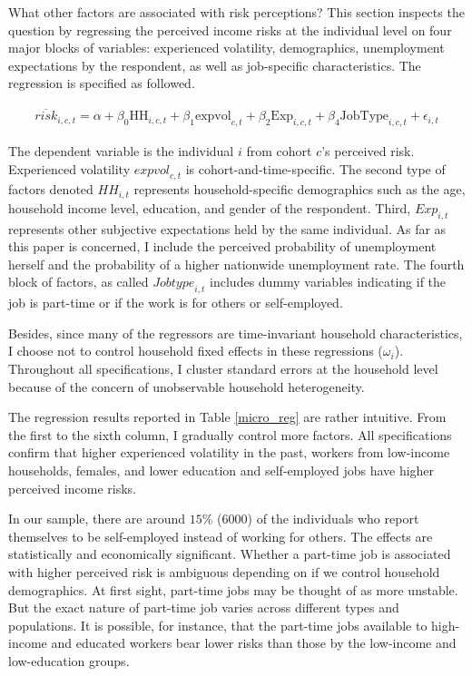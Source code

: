 \documentclass[12pt,notitlepage,onecolumn,aps,pra]{article}
\begin{document}
What other factors are associated with risk perceptions? This section
inspects the question by regressing the perceived income risks at the
individual level on four major blocks of variables: experienced
volatility, demographics, unemployment expectations by the respondent,
as well as job-specific characteristics. The regression is specified as
followed.

\begin{eqnarray}
\overline{risk}_{i,c,t} = \alpha + \beta_0 \textrm{HH}_{i,c,t} + \beta_1 \textrm{expvol}_{c,t} + \beta_2 \textrm{Exp}_{i,c,t} + \beta_4 \textrm{JobType}_{i,c,t} + \epsilon_{i,t}
\end{eqnarray}

The dependent variable is the individual \(i\) from cohort \(c\)'s
perceived risk. Experienced volatility \(\textit{expvol}_{c,t}\) is
cohort-and-time-specific. The second type of factors denoted
\(\textit{HH}_{i,t}\) represents household-specific demographics such as
the age, household income level, education, and gender of the
respondent. Third, \(\textit{Exp}_{i,t}\) represents other subjective
expectations held by the same individual. As far as this paper is
concerned, I include the perceived probability of unemployment herself
and the probability of a higher nationwide unemployment rate. The fourth
block of factors, as called \(\textit{Jobtype}_{i,t}\) includes dummy
variables indicating if the job is part-time or if the work is for
others or self-employed.

Besides, since many of the regressors are time-invariant household
characteristics, I choose not to control household fixed effects in
these regressions (\(\omega_i\)). Throughout all specifications, I
cluster standard errors at the household level because of the concern of
unobservable household heterogeneity.

The regression results reported in Table \ref{micro_reg} are rather
intuitive. From the first to the sixth column, I gradually control more
factors. All specifications confirm that higher experienced volatility
in the past, workers from low-income households, females, and lower
education and self-employed jobs have higher perceived income risks.

In our sample, there are around \(15\%\) (6000) of the individuals who
report themselves to be self-employed instead of working for others. The
effects are statistically and economically significant. Whether a
part-time job is associated with higher perceived risk is ambiguous
depending on if we control household demographics. At first sight,
part-time jobs may be thought of as more unstable. But the exact nature
of part-time job varies across different types and populations. It is
possible, for instance, that the part-time jobs available to high-income
and educated workers bear lower risks than those by the low-income and
low-education groups.
\end{document}
